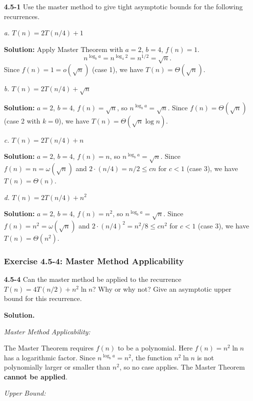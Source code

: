 \documentclass{article}
\theoremstyle{theorem}
\theoremstyle{definition}
\theoremstyle{remark}
\begin{document}
\textbf{4.5-1}
Use the master method to give tight asymptotic bounds for the following recurrences.

\textit{a. } $T(n) = 2T(n/4) + 1$

\textbf{Solution:} Apply Master Theorem with $a = 2$, $b = 4$, $f(n) = 1$.
\[
n^{\log_b a} = n^{\log_4 2} = n^{1/2} = \sqrt{n}.
\]
Since $f(n) = 1 = o(\sqrt{n})$ (case 1), we have $T(n) = \Theta(\sqrt{n})$.

\vspace{0.2cm}
\textit{b. } $T(n) = 2T(n/4) + \sqrt{n}$

\textbf{Solution:} $a = 2$, $b = 4$, $f(n) = \sqrt{n}$, so $n^{\log_b a} = \sqrt{n}$.
Since $f(n) = \Theta(\sqrt{n})$ (case 2 with $k = 0$), we have $T(n) = \Theta(\sqrt{n} \log n)$.

\vspace{0.2cm}
\textit{c. } $T(n) = 2T(n/4) + n$

\textbf{Solution:} $a = 2$, $b = 4$, $f(n) = n$, so $n^{\log_b a} = \sqrt{n}$.
Since $f(n) = n = \omega(\sqrt{n})$ and $2 \cdot (n/4) = n/2 \le cn$ for $c < 1$ (case 3), we have $T(n) = \Theta(n)$.

\vspace{0.2cm}
\textit{d. } $T(n) = 2T(n/4) + n^2$

\textbf{Solution:} $a = 2$, $b = 4$, $f(n) = n^2$, so $n^{\log_b a} = \sqrt{n}$.
Since $f(n) = n^2 = \omega(\sqrt{n})$ and $2 \cdot (n/4)^2 = n^2/8 \le cn^2$ for $c < 1$ (case 3), we have $T(n) = \Theta(n^2)$.

\vspace{0.3cm}

\subsubsection{Exercise 4.5-4: Master Method Applicability}

\textbf{4.5-4}
Can the master method be applied to the recurrence $T(n)=4T(n/2)+n^2\ln n$? Why or why not? Give an asymptotic upper bound for this recurrence.

\textbf{Solution.}

\textit{Master Method Applicability:}

The Master Theorem requires $f(n)$ to be a polynomial. Here $f(n) = n^2 \ln n$ has a logarithmic factor. Since $n^{\log_b a} = n^2$, the function $n^2 \ln n$ is not polynomially larger or smaller than $n^2$, so no case applies. The Master Theorem \textbf{cannot be applied}.

\textit{Upper Bound:}
\end{document}

